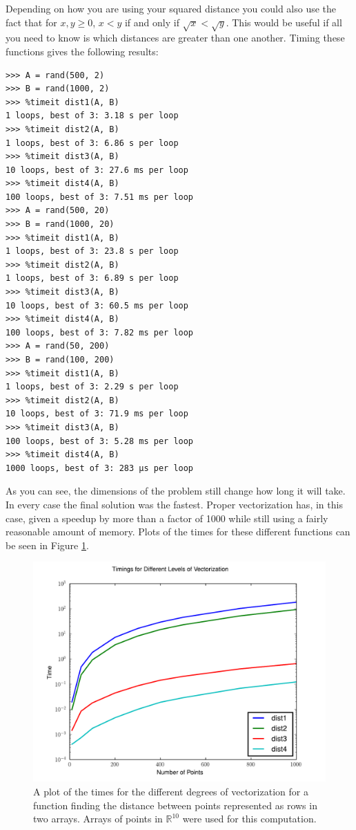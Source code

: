 Depending on how you are using your squared distance you could also use the fact that for $x, y \geq 0$, $x < y$ if and only if $\sqrt{x} < \sqrt{y}$.
This would be useful if all you need to know is which distances are greater than one another.
Timing these functions gives the following results:
\begin{lstlisting}
>>> A = rand(500, 2)
>>> B = rand(1000, 2)
>>> %timeit dist1(A, B)
1 loops, best of 3: 3.18 s per loop
>>> %timeit dist2(A, B)
1 loops, best of 3: 6.86 s per loop
>>> %timeit dist3(A, B)
10 loops, best of 3: 27.6 ms per loop
>>> %timeit dist4(A, B)
100 loops, best of 3: 7.51 ms per loop
>>> A = rand(500, 20)
>>> B = rand(1000, 20)
>>> %timeit dist1(A, B)
1 loops, best of 3: 23.8 s per loop
>>> %timeit dist2(A, B)
1 loops, best of 3: 6.89 s per loop
>>> %timeit dist3(A, B)
10 loops, best of 3: 60.5 ms per loop
>>> %timeit dist4(A, B)
100 loops, best of 3: 7.82 ms per loop
>>> A = rand(50, 200)
>>> B = rand(100, 200)
>>> %timeit dist1(A, B)
1 loops, best of 3: 2.29 s per loop
>>> %timeit dist2(A, B)
10 loops, best of 3: 71.9 ms per loop
>>> %timeit dist3(A, B)
100 loops, best of 3: 5.28 ms per loop
>>> %timeit dist4(A, B)
1000 loops, best of 3: 283 µs per loop
\end{lstlisting}
As you can see, the dimensions of the problem still change how long it will take.
In every case the final solution was the fastest.
Proper vectorization has, in this case, given a speedup by more than a factor of 1000 while still using a fairly reasonable amount of memory.
Plots of the times for these different functions can be seen in Figure \ref{distplot}.

\begin{figure}
\includegraphics[width=\textwidth]{distplot.pdf}
\caption{A plot of the times for the different degrees of vectorization for a function finding the distance between points represented as rows in two arrays. Arrays of points in $\mathbb{R}^{10}$ were used for this computation.}
\label{distplot}
\end{figure}

